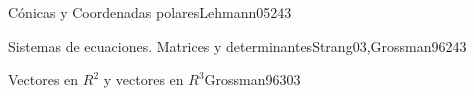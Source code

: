 \begin{syllabus}
\begin{unit}{Cónicas y Coordenadas polares}{Lehmann05}{24}{3}
   \begin{learningoutcomes}
      \item 
      \item
      \item 
      \end{learningoutcomes}
\end{unit}

\begin{unit}{Sistemas de ecuaciones. Matrices y determinantes}{Strang03,Grossman96}{24}{3}
   \begin{topics}
      \item 
      \item 
      \item 
      \end{topics}

   \begin{learningoutcomes}
      \item 
      \item 
      \item 
     
   \end{learningoutcomes}
\end{unit}

\begin{unit}{Vectores en $R^2$ y vectores en $R^3$}{Grossman96}{30}{3}
   \begin{topics}
      \item 
      \item 
   \end{topics}

   \begin{learningoutcomes}
      \item 
      \item 
      \item 
   \end{learningoutcomes}
\end{unit}



\begin{coursebibliography}
\end{coursebibliography}

\end{syllabus}
